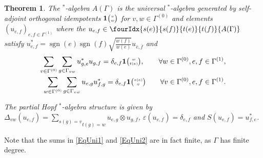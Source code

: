 \documentclass[10pt]{article}
\DeclareMathOperator{\sgn}{\mathrm{sgn}}
\newcommand{\Grt}[3]{#1{\tiny {\begin{pmatrix} #2\\#3\end{pmatrix}}}}
\newcommand{\UnitC}[2]{\Grt{\mathbf{1}}{#1}{#2}}
\newcommand{\Grru}[2]{{\tiny \begin{pmatrix} #1 \\ #2\end{pmatrix}}}
\newcommand{\Gr}[5]{\fourIdx{#2}{#4}{#3}{#5}{#1}}%
\newtheorem{Theorem}{Theorem}[section]
\theoremstyle{definition}
\numberwithin{equation}{section}
\begin{document}
\begin{Theorem}\label{TheoGenRel} The $^*$-algebra $A(\Gamma)$ is the universal $^*$-algebra generated by self-adjoint orthogonal idempotents $\UnitC{v}{w}$ for $v,w\in \Gamma^{(0)}$ and elements $(u_{e,f})_{e,f\in \Gamma^{(1)}}$ where the $u_{e,f}\in \Gr{A(\Gamma)}{s(e)}{t(e)}{s(f)}{t(f)}$ satisfy $u_{e,f}^* = \sgn(e)\sgn(f)\sqrt{\frac{w(f)}{w(e)}} u_{\bar{e},\bar{f}}$ and 
\begin{eqnarray} 
\label{EqUni1}\sum_{v\in \Gamma^{(0)}}\sum_{g\in \Gamma_{vw}} u_{g,e}^*u_{g,f} = \delta_{e,f}\mathbf{1}\Grru{w}{t(e)}, \qquad \forall w\in \Gamma^{(0)}, e,f\in \Gamma^{(1)},\\ 
\label{EqUni2}\sum_{w\in \Gamma^{(0)}} \sum_{g\in \Gamma_{vw}} u_{e,g}u_{f,g}^* = \delta_{e,f} \mathbf{1}\Grru{s(e)}{v}\qquad \forall v\in \Gamma^{(0)}, e,f\in \Gamma^{(1)}.
\end{eqnarray}

The partial Hopf $^*$-algebra structure is given by $\Delta_{vw}(u_{e,f}) = \underset{t(g) = w}{\underset{s(g) = v}{\sum}} u_{e,g}\otimes u_{g,f}$, $\varepsilon(u_{e,f}) = \delta_{e,f}$ and $S(u_{e,f}) = u_{f,e}^*$. 
\end{Theorem} 

Note that the sums in \eqref{EqUni1} and \eqref{EqUni2} are in fact finite, as $\Gamma$ has finite degree. 
\end{document}
